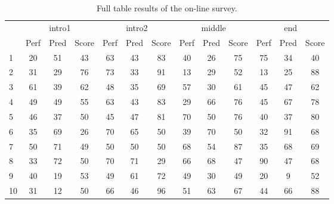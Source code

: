 \begin{table}[ht!]
\centering
  \caption[Full table results of the on-line survey.]{Full table results of the on-line survey.}
  \label{tab:survey_results}
  \footnotesize
\begin{tabular}{l|ccc|ccc|ccc|ccc}

\hline
\multicolumn{1}{c}{\multirow{2}{*}{}} & \multicolumn{3}{c}{intro1} & \multicolumn{3}{c}{intro2} & \multicolumn{3}{c}{middle}  & \multicolumn{3}{c}{end} \\ 
\multicolumn{1}{c}{}                      & \multicolumn{1}{c}{Perf} & \multicolumn{1}{c}{Pred} & \multicolumn{1}{c}{Score} & \multicolumn{1}{c}{Perf} & \multicolumn{1}{c}{Pred} & \multicolumn{1}{c}{Score} & \multicolumn{1}{c}{Perf} & \multicolumn{1}{c}{Pred} & \multicolumn{1}{c}{Score} & \multicolumn{1}{c}{Perf} & \multicolumn{1}{c}{Pred} & \multicolumn{1}{c}{Score} \\ \hline
1 & 20 & 51 & 43 & 63 & 43 & 83 & 40 & 26 & 75 & 75 & 34 & 40 \\ 
2 & 31 & 29 & 76 & 73 & 33 & 91 & 13 & 29 & 52 & 13 & 25 & 88 \\ 
3 & 61 & 39 & 62 & 48 & 35 & 69 & 57 & 30 & 61 & 45 & 47 & 62 \\
4 & 49 & 49 & 55 & 63 & 43 & 83 & 29 & 66 & 76 & 45 & 67 & 78 \\
5 & 46 & 37 & 50 & 45 & 47 & 81 & 70 & 50 & 76 & 40 & 37 & 80 \\ 
6 & 35 & 69 & 26 & 70 & 65 & 50 & 39 & 70 & 50 & 32 & 91 & 68 \\
7 & 50 & 71 & 49 & 50 & 50 & 50 & 68 & 54 & 87 & 35 & 68 & 69 \\
8 & 33 & 72 & 50 & 70 & 71 & 29 & 66 & 68 & 47 & 90 & 47 & 68 \\
9 & 40 & 19 & 53 & 49 & 61 & 72 & 49 & 30 & 49 & 20 & 9 & 52 \\
10 & 31 & 12 & 50 & 66 & 46 & 96 & 51 & 63 & 67 & 44 & 66 & 88 \\ \hline                  
\end{tabular}

\end{table}
